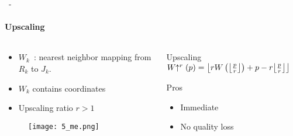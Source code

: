 \documentclass[aspectratio=169, 22pt]{beamer}
\DeclarePairedDelimiter\floor{\lfloor}{\rfloor}
\begin{document}
\begin{frame}{\secname~- \subsecname}
  \framesubtitle{Upscaling}
  \begin{columns}
    \begin{column}{0.5\linewidth}
      \begin{itemize}
      \item $W_k$~: nearest neighbor mapping from $R_k$ to $J_k$.
      \item $W_k$ contains \alert{coordinates}
      \item Upscaling ratio $r > 1$
      \end{itemize}
      \begin{figure}
        \texttt{[image: 5\_me.png]}
      \end{figure}

    \end{column}
    \begin{column}{0.5\linewidth}
      \begin{block}{Upscaling}
        \centering
        $W\!\!\uparrow^r(p) = \floor*{rW\left(\floor*{\frac{p}{r}}\right) + p - r\floor*{\frac{p}{r}}}$
      \end{block}
      \vspace{1em}
      \begin{exampleblock}{Pros}
        \begin{itemize}
        \item Immediate
        \item No quality loss
        \end{itemize}
      \end{exampleblock}
    \end{column}
  \end{columns}
\end{frame}
\end{document}
